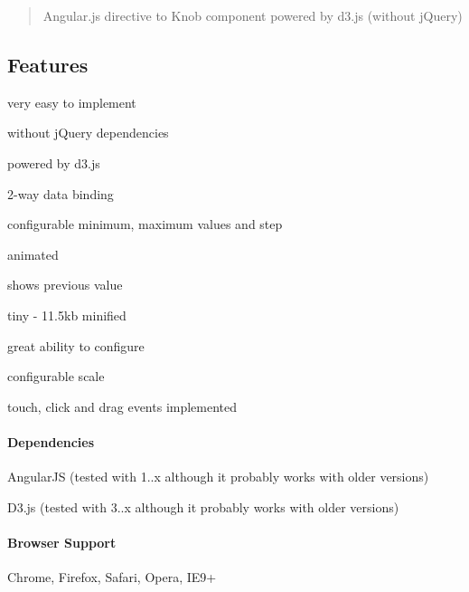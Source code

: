 \href{https://gitter.im/RadMie/ng-knob?utm_source=badge&utm_medium=badge&utm_campaign=pr-badge&utm_content=badge}{\tt } \begin{quote}
Angular.\+js directive to Knob component powered by d3.\+js (without j\+Query) \end{quote}




\subsection*{Features }


\begin{DoxyItemize}
\item very easy to implement
\item without j\+Query dependencies
\item powered by d3.\+js
\item 2-\/way data binding
\item configurable minimum, maximum values and step
\item animated
\item shows previous value
\item tiny -\/ 11.\+5kb minified
\item great ability to configure
\item configurable scale
\item touch, click and drag events implemented
\end{DoxyItemize}

\paragraph*{Dependencies}


\begin{DoxyItemize}
\item Angular\+JS (tested with 1..\+x although it probably works with older versions)
\item D3.\+js (tested with 3..\+x although it probably works with older versions)
\end{DoxyItemize}

\paragraph*{Browser Support}


\begin{DoxyItemize}
\item Chrome, Firefox, Safari, Opera, I\+E9+
\end{DoxyItemize}

